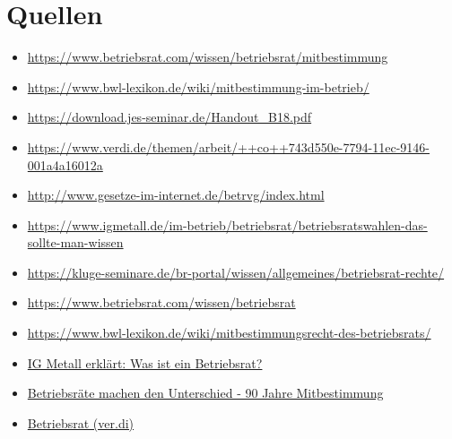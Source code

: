 \documentclass[
  a4paper,            %
  DIV=10,             %
  oneside,            %
  BCOR=5mm,           %
  parskip=half,       %
  numbers=noenddot    %
]{scrartcl}
\begin{document}
\section{Quellen}
   \begin{itemize}
   	\item 
   	\url{https://www.betriebsrat.com/wissen/betriebsrat/mitbestimmung}
   	\item  
   	\url{https://www.bwl-lexikon.de/wiki/mitbestimmung-im-betrieb/}
   	\item
   	\url{https://download.jes-seminar.de/Handout_B18.pdf}
	\item 
	\url{https://www.verdi.de/themen/arbeit/++co++743d550e-7794-11ec-9146-001a4a16012a}
	\item
	\url{http://www.gesetze-im-internet.de/betrvg/index.html} 
	\item 
	\url{https://www.igmetall.de/im-betrieb/betriebsrat/betriebsratswahlen-das-sollte-man-wissen}
	\item 
	\url{https://kluge-seminare.de/br-portal/wissen/allgemeines/betriebsrat-rechte/}
	\item 
	\url{https://www.betriebsrat.com/wissen/betriebsrat}
	\item 
	\url{https://www.bwl-lexikon.de/wiki/mitbestimmungsrecht-des-betriebsrats/}
	\item 
	\href{https://youtu.be/aPiJ-byyQyU}{IG Metall erklärt: Was ist ein Betriebsrat?}
	\item
	\href{https://youtu.be/7nTdul3NSA4}{Betriebsräte machen den Unterschied - 90 Jahre Mitbestimmung}
	\item
	\href{https://youtu.be/MrKcdzwGqcw}{Betriebsrat (ver.di)}
\end{itemize}

%
%

\clearpage
\end{document}
